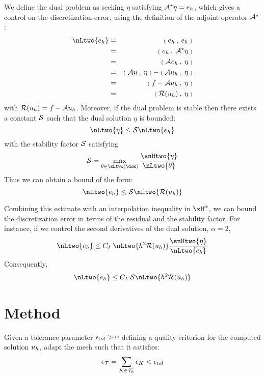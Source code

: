 We define the dual problem as seeking $\eta$ satisfying $\mathcal{A}^\star\eta = e_h$, which gives a control on the discretization error, using the definition of the adjoint operator $\mathcal{A}^\star$:
\begin{eqnarray*}
\nLtwo{e_h} &=& \Inner{e_h}{e_h}\\
            &=& \Inner{e_h}{\opA^\star\eta}\\
            &=& \Inner{\opA e_h}{\eta}\\
            &=& \Inner{\opA u}{\eta} - \Inner{\opA \uh}{\eta}\\
            &=& \Inner{f - \opA \uh}{\eta}\\
            &=& \Inner{\Res \uh}{\eta}
\end{eqnarray*}
with ${\mathcal{R}({u_h})} = f -  \mathcal{A} {u_h}$. Moreover, if the dual problem is stable then there exists a constant $\mathcal{S}$ such that the dual solution $\eta$ is bounded:
\begin{equation*}
\nLtwo{\eta} \leq \Stab \nLtwo{e_h}
\end{equation*}
with the stability factor $\mathcal{S}$ satisfying
\begin{equation*}
\Stab = \max_{\theta\in\xLtwo(\dom)}\dfrac{\snHtwo{\eta}}{\nLtwo{\theta}}
\end{equation*}
Thus we can obtain a bound of the form:
\begin{equation*}
\nLtwo{e_h} \leq \Stab \nLtwo{\Res \uh}
\end{equation*}

\medskip
Combining this estimate with an interpolation inequality in $\xH^\alpha$, we can bound the discretization error in terms of the residual and the stability factor.
For instance, if we control the second derivatives of the dual solution, \ie $\alpha = 2$,
\begin{eqnarray*}
\nLtwo{e_h} \leq C_I\;\nLtwo{h^2\Res \uh}\dfrac{\snHtwo{\eta}}{\nLtwo{e_h}}
\end{eqnarray*}
Consequently,
\begin{eqnarray*}
\nLtwo{e_h} \leq C_I\;\Stab\nLtwo{h^2\Res \uh}
\end{eqnarray*}

\section{Method}

\begin{dfntn}[$h$-adaptivity]
Given a tolerance parameter $\epsilon_{\mathrm tol} > 0$ defining a quality criterion for the computed solution ${u_h}$, adapt the mesh such that it satisfies:
\begin{equation*}
\epsilon_{\mathcal T} = \sum_{K\in{\mathcal T}_h} \epsilon_K < \epsilon_{\mathrm tol}
\end{equation*}
\end{dfntn}

